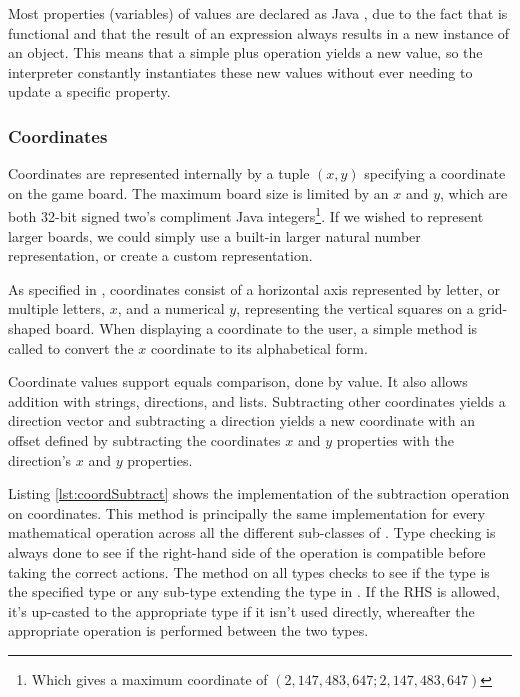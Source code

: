 Most properties (variables) of values are declared as Java
, due to the fact that \productname{} is functional and
that the result of an expression always results in a new instance of an
object. This means that a simple plus operation yields a new value, so
the interpreter constantly instantiates these new values without ever
needing to update a specific property.

\subsubsection{Coordinates}
Coordinates are represented internally by a tuple $(x, y)$ specifying
a coordinate on the game board. The maximum board size is limited by
an $x$ and $y$, which are both 32-bit signed two's compliment Java
integers\footnote{Which gives a maximum coordinate of $(2,147,483,647;
2,147,483,647)$}. If we wished to represent larger boards, we could
simply use a built-in larger natural number representation, or create a
custom representation.

As specified in , coordinates consist of
a horizontal axis represented by letter, or multiple letters, $x$, and a
numerical $y$, representing the vertical squares on a grid-shaped board.
When displaying a coordinate to the user, a simple method is called to
convert the $x$ coordinate to its alphabetical form.

Coordinate values support equals comparison, done by value. It
also allows addition with strings, directions, and lists. Subtracting
other coordinates yields a direction vector and subtracting a direction
yields a new coordinate with an offset defined by subtracting the
coordinates $x$ and $y$ properties with the direction's $x$ and $y$
properties.



Listing \ref{lst:coordSubtract} shows the implementation of the subtraction operation on coordinates. This method is principally the same implementation for every mathematical operation across all the different sub-classes of . Type checking is always done to see if the right-hand side of the operation is compatible before taking the correct actions. The method  on all  types checks to see if the type is the specified type or any sub-type extending the type in \productname{}. If the RHS is allowed, it's up-casted to the appropriate type if it isn't used directly, whereafter the appropriate operation is performed between the two types.

